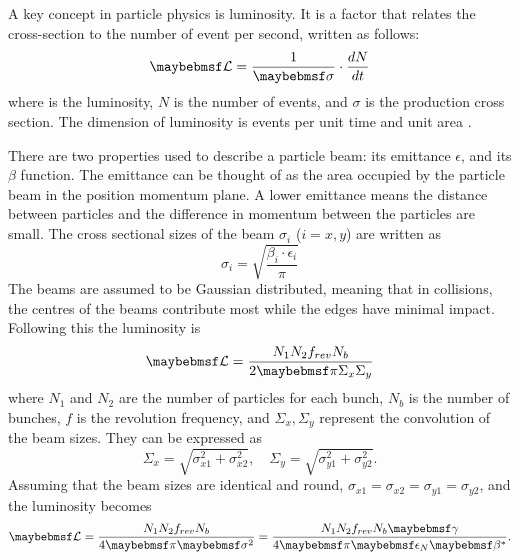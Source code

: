 A key concept in particle physics is luminosity. It is a factor that relates the cross-section to the number of event per second, written as follows:
\begin{equation}
    \luminosity=\dfrac{1}{\sigma}\cdot\dfrac{dN}{dt}
\end{equation}
where \luminosity is the luminosity, $N$ is the number of events, and $\sigma$ is the production cross section. The dimension of luminosity is events per unit time and unit area \unit{}{\cm\rpsquared}\unit{}{\second\rp}.

There are two properties used to describe a particle beam: its  emittance $\epsilon$, and its $\beta$ function. The emittance can be thought of as the area occupied by the particle beam in the position momentum plane. A lower emittance means the distance between particles and the difference in momentum between the particles are small. The cross sectional sizes of the beam $\sigma_i$ ($i=x,y$) are written as 
\begin{equation}
    \sigma_i=\sqrt{\dfrac{\beta_i\cdot\epsilon_i}{\pi}}
\end{equation}
The beams are assumed to be Gaussian distributed, meaning that in collisions, the centres of the beams contribute most while the edges have minimal impact. Following this the luminosity is
\begin{equation}
    \luminosity=\dfrac{N_1N_2f_{rev}N_b}{2\pi\Sigma_x\Sigma_y}
\end{equation}
where $N_1$ and $N_2$ are the number of particles for each bunch, $N_b$ is the number of bunches, $f$ is the revolution frequency, and $\Sigma_x,\Sigma_y$ represent the  convolution of the beam sizes. They can be expressed as
\begin{equation}
    \Sigma_x=\sqrt{\sigma_{x1}^2+\sigma_{x2}^2}, \quad \Sigma_y=\sqrt{\sigma_{y1}^2+\sigma_{y2}^2}.
\end{equation}
Assuming that the beam sizes are identical and round, $\sigma_{x1}=\sigma_{x2}=\sigma_{y1}=\sigma_{y2}$, and the luminosity becomes
\begin{equation}
    \luminosity=\dfrac{N_1N_2f_{rev}N_b}{4\pi\sigma^2}=\dfrac{N_1N_2f_{rev}N_b\gamma}{4\pi\epsilon_N\beta^*}.
\end{equation}

